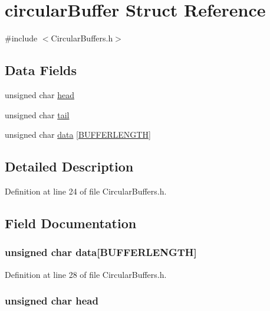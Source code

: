 \hypertarget{structcircular_buffer}{\section{circular\+Buffer Struct Reference}
\label{structcircular_buffer}
}


{\ttfamily \#include $<$Circular\+Buffers.\+h$>$}

\subsection*{Data Fields}
\begin{DoxyCompactItemize}
\item 
unsigned char \hyperlink{structcircular_buffer_a47f7e6109597e5c1c227993c0ce5f560}{head}
\item 
unsigned char \hyperlink{structcircular_buffer_af18a1d7542e277284c4794593b049258}{tail}
\item 
unsigned char \hyperlink{structcircular_buffer_ad7b57ba90694482456be1fbab7de4aec}{data} \mbox{[}\hyperlink{_circular_buffers_8h_a5a69f707d5405fe875b322c6bfbace46}{B\+U\+F\+F\+E\+R\+L\+E\+N\+G\+T\+H}\mbox{]}
\end{DoxyCompactItemize}


\subsection{Detailed Description}


Definition at line 24 of file Circular\+Buffers.\+h.



\subsection{Field Documentation}
\hypertarget{structcircular_buffer_ad7b57ba90694482456be1fbab7de4aec}{
\subsubsection[{data}]{\setlength{\rightskip}{0pt plus 5cm}unsigned char data\mbox{[}{\bf B\+U\+F\+F\+E\+R\+L\+E\+N\+G\+T\+H}\mbox{]}}}\label{structcircular_buffer_ad7b57ba90694482456be1fbab7de4aec}


Definition at line 28 of file Circular\+Buffers.\+h.

\hypertarget{structcircular_buffer_a47f7e6109597e5c1c227993c0ce5f560}{
\subsubsection[{head}]{\setlength{\rightskip}{0pt plus 5cm}unsigned char head}}\label{structcircular_buffer_a47f7e6109597e5c1c227993c0ce5f560}


